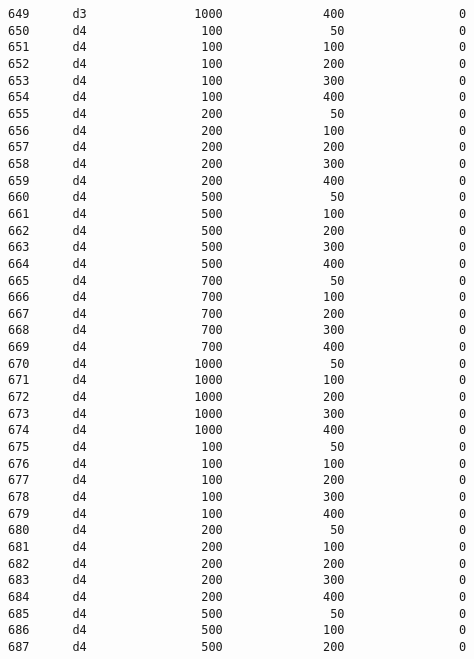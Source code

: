 \documentclass[11pt]{article}
\begin{document}
\begin{Verbatim}[commandchars=\\\{\}]
649      d3               1000              400                0   
650      d4                100               50                0   
651      d4                100              100                0   
652      d4                100              200                0   
653      d4                100              300                0   
654      d4                100              400                0   
655      d4                200               50                0   
656      d4                200              100                0   
657      d4                200              200                0   
658      d4                200              300                0   
659      d4                200              400                0   
660      d4                500               50                0   
661      d4                500              100                0   
662      d4                500              200                0   
663      d4                500              300                0   
664      d4                500              400                0   
665      d4                700               50                0   
666      d4                700              100                0   
667      d4                700              200                0   
668      d4                700              300                0   
669      d4                700              400                0   
670      d4               1000               50                0   
671      d4               1000              100                0   
672      d4               1000              200                0   
673      d4               1000              300                0   
674      d4               1000              400                0   
675      d4                100               50                0   
676      d4                100              100                0   
677      d4                100              200                0   
678      d4                100              300                0   
679      d4                100              400                0   
680      d4                200               50                0   
681      d4                200              100                0   
682      d4                200              200                0   
683      d4                200              300                0   
684      d4                200              400                0   
685      d4                500               50                0   
686      d4                500              100                0   
687      d4                500              200                0   

\end{Verbatim}
\end{document}
